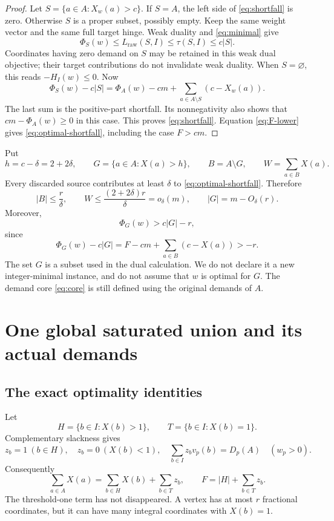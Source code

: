 \documentclass[11pt,a4paper]{article}
\theoremstyle{remark}
\newcommand{\LP}{L_{\mathrm{raw}}}
\begin{document}
\begin{proof}
Let \(S=\{a\in A:X_w(a)>c\}\). If \(S=A\), the left side of
\eqref{eq:shortfall} is zero. Otherwise \(S\) is a proper subset,
possibly empty. Keep the same weight vector and the same full target
hinge. Weak duality and \eqref{eq:minimal} give
\[
 \Phi_S(w)\le\LP(S,I)\le\tau(S,I)\le c|S|.
\]
Coordinates having zero demand on \(S\) may be retained in this
weak dual objective; their target contributions do not invalidate
weak duality. When \(S=\varnothing\), this reads \(-H_I(w)\le0\).
Now
\[
 \Phi_S(w)-c|S|
 =\Phi_A(w)-cm+\sum_{a\in A\setminus S}(c-X_w(a)).
\]
The last sum is the positive-part shortfall. Its nonnegativity also
shows that \(cm-\Phi_A(w)\ge0\) in this case. This proves
\eqref{eq:shortfall}. Equation \eqref{eq:F-lower} gives
\eqref{eq:optimal-shortfall}, including the case \(F>cm\).
\end{proof}

Put
\begin{equation}
 h=c-\delta=2+2\delta,\qquad
 G=\{a\in A:X(a)>h\},\qquad B=A\setminus G,\qquad
 W=\sum_{a\in B}X(a).
 \label{eq:G}
\end{equation}
Every discarded source contributes at least \(\delta\) to
\eqref{eq:optimal-shortfall}. Therefore
\begin{equation}
 |B|\le\frac r\delta,\qquad
 W\le\frac{(2+2\delta)r}{\delta}=o_\delta(m),\qquad
 |G|=m-O_\delta(r).
 \label{eq:discard}
\end{equation}
Moreover,
\begin{equation}
 \Phi_G(w)>c|G|-r,
 \label{eq:G-lower}
\end{equation}
since
\[
 \Phi_G(w)-c|G|
 =F-cm+\sum_{a\in B}(c-X(a))>-r.
\]
The set \(G\) is a subset used in the dual calculation. We do not
declare it a new integer-minimal instance, and do not assume that
\(w\) is optimal for \(G\). The demand core \eqref{eq:core} is still
defined using the original demands of \(A\).

\section{One global saturated union and its actual demands}

\subsection{The exact optimality identities}

Let
\[
 H=\{b\in I:X(b)>1\},\qquad T=\{b\in I:X(b)=1\}.
\]
Complementary slackness gives
\begin{equation}
 z_b=1\ (b\in H),\quad z_b=0\ (X(b)<1),\quad
 \sum_{b\in I}z_bv_p(b)=D_p(A)\quad(w_p>0).
 \label{eq:cs}
\end{equation}
Consequently
\begin{equation}
 \sum_{a\in A}X(a)=\sum_{b\in H}X(b)+\sum_{b\in T}z_b,
 \qquad F=|H|+\sum_{b\in T}z_b.
 \label{eq:boundary}
\end{equation}
The threshold-one term has not disappeared. A vertex has at most
\(r\) fractional coordinates, but it can have many integral
coordinates with \(X(b)=1\).
\end{document}

